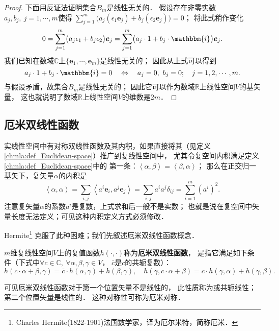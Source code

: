 \begin{proof}
下面用反证法证明集合$B_m$是线性无关的．
假设存在非零实数$a_{j},b_j,\ j=1,\cdots,m$使得
$\sum_{j=1}^{m}\bigl(a_j (\epsilon_1 \boldsymbol{e}_j )+ b_j (\epsilon_2 \boldsymbol{e}_j )\bigr)= 0$；
将此式稍作变化
\begin{equation}
    0=\sum_{j=1}^{m}\bigl(a_j \epsilon_1 + b_j \epsilon_2 \bigr) \boldsymbol{e}_j
     =\sum_{j=1}^{m}\bigl(a_j \cdot 1 + b_j \cdot \mathbbm{i}\bigr) \boldsymbol{e}_j .
\end{equation}
我们已知在数域$\mathbb{C}$上$\{\boldsymbol{e}_1,\cdots,\boldsymbol{e}_m\}$是线性无关的；
因此从上式可以得到
\begin{equation}
    a_j \cdot 1 + b_j \cdot \mathbbm{i}=0\quad \Leftrightarrow \quad
    a_j=0,\ b_j =0; \quad j=1,2,\cdots,m.
\end{equation}
与假设矛盾，故集合$B_m$是线性无关的；
因此它可以作为数域$\mathbb{R}$上线性空间$V$的基矢量，
这也就说明了数域$\mathbb{R}$上线性空间$V$的维数是$2m$．
\end{proof}



\subsection{厄米双线性函数}
实线性空间中有对称双线性函数及其内积，如果直接将其（见定义\ref{chmla:def_Euclidean-space}）推广到复线性空间中，
尤其令复空间内积满足定义\ref{chmla:def_Euclidean-space}中的
第一条：$\left<\alpha,\beta\right>=\left<\beta,\alpha\right>$；
那么在正交归一基矢下，复矢量$\alpha$的内积是
\begin{equation}
    \left<\alpha,\alpha\right> = \sum_{i,j}\left<a^i \boldsymbol{e}_i, a^j\boldsymbol{e}_j\right>
    =\sum_{i,j} a^i a^j \delta_{ij} = \sum_{i=1}^{m} (a^i)^2 .
\end{equation}
注意复矢量$\alpha$的系数$a^i$是复数，上式求和后一般不是实数；
也就是说在复空间中矢量长度无法定义；可见这种内积定义方式必须修改． 

Hermite{\footnote{Charles Hermite(1822-1901)法国数学家，译为厄尔米特，简称厄米．}}
克服了此种困难；我们先叙述厄米双线性函数概念．
\begin{definition}
    $m$维复线性空间$V$上的复值函数$h(\cdot,\cdot)$称为{\bfseries\heiti 厄米双线性函数}，
    是指它满足如下条件（下式中$\forall c\in \mathbb{C},\  \forall \alpha,\beta,\gamma\in V$，
    $\bar{c}$是$c$的共轭复数）：
    \begin{equation*}
        h(c\cdot \alpha+\beta,\gamma) = \bar{c}\cdot h(\alpha,\gamma)+ h(\beta,\gamma),\quad
        h(\gamma,c\cdot \alpha+\beta) = c\cdot h(\gamma,\alpha)+ h(\gamma,\beta).
    \end{equation*}
\end{definition}
可见厄米{\kaishu 双线性}函数对于第一个位置矢量不是线性的，
此性质称为或{\heiti 共轭线性}；第二个位置矢量是线性的．
这种对称性可称为{\heiti 厄米对称}．

